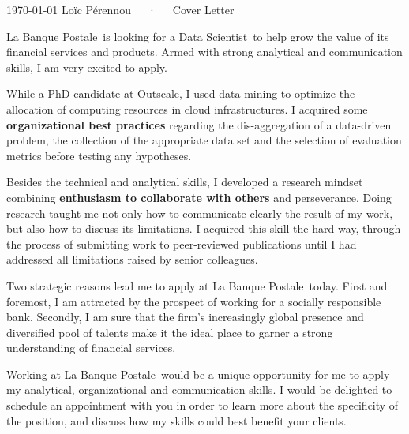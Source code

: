\documentclass[11pt, a4paper]{awesome-cv}
\newcommand{\company}{La Banque Postale}
\newcommand{\job}{Data Scientist}
\begin{document}
\makecvheader[R]

\makecvfooter
  {\today}
  {Loïc Pérennou~~~·~~~Cover Letter}
  {}

\makelettertitle

\begin{cvletter}
\company~is looking for a \job~to help grow the value of its financial services and products. 
Armed with strong analytical and communication skills, I am very excited to apply. 

While a PhD candidate at Outscale, I used data mining to optimize the allocation of computing resources in cloud infrastructures. 
I acquired some \textbf{organizational best practices} regarding the dis-aggregation of a data-driven problem, the collection of the appropriate data set and the selection of evaluation metrics before testing any hypotheses. 

Besides the technical and analytical skills, I developed a research mindset combining \textbf{enthusiasm to collaborate with others} and perseverance.  
Doing research taught me not only how to communicate clearly the result of my work, but also how to discuss its limitations. 
I acquired this skill the hard way, through the process of submitting work to peer-reviewed publications until I had addressed all limitations raised by senior colleagues.  

Two strategic reasons lead me to apply at \company~today.   
First and foremost, I am attracted by the prospect of working for a socially responsible bank.   
Secondly, I am sure that the firm's increasingly global presence and diversified pool of talents make it the ideal place to garner a strong understanding of financial services. 

Working at \company~would be a unique opportunity for me to apply my analytical, organizational and communication skills. 
I would be delighted to schedule an appointment with you in order to learn more about the specificity of the position, and discuss how my skills could best benefit your clients.
\end{cvletter}


\makeletterclosing
\end{document}
